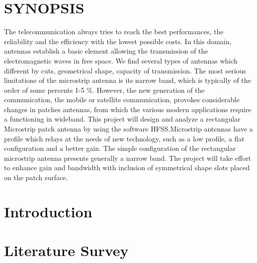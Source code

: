\documentclass[12pt]{article}
\begin{document}
\tableofcontents
\thispagestyle{empty}
\cleardoublepage
\listoffigures
\thispagestyle{empty}
\cleardoublepage
\listoftables
\thispagestyle{empty}
\cleardoublepage




\section*{SYNOPSIS}
	\justify
	The telecommunication always tries to reach the best performances, the reliability and the efficiency with the lowest possible costs. In this domain, antennas establish a basic element allowing the transmission of the electromagnetic waves in free space. We find several types of antennas which different by cuts, geometrical shape, capacity of transmission. The most serious limitations of the microstrip antenna is its narrow band, which is typically of the order of some percents 1-5 \%. However, the new generation of the communication, the mobile or satellite communication, provokes considerable changes in patches antennas, from which the various modern applications require a functioning in wideband.
	This  project will design and analyze a rectangular Microstrip patch antenna by using the software HFSS.Microstrip antennas have a profile which relays at the needs of new technology, such as a low profile, a flat configuration and a better gain. The simple configuration of the rectangular microstrip antenna presents generally a narrow band. The project will take effort to enhance gain and bandwidth with inclusion of symmetrical shape slots placed on the patch surface.
\thispagestyle{empty}
\cleardoublepage




\setcounter{page}{1}
\section{Introduction}\label{sec:Introduction}
 


\section{Literature Survey}\label{sec:Literature Survey}
 
\end{document}
